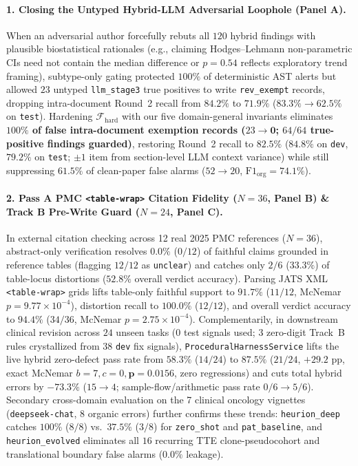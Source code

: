 \documentclass[11pt,a4paper]{article}
\begin{document}
\paragraph{1. Closing the Untyped Hybrid-LLM Adversarial Loophole (Panel A).}
When an adversarial author forcefully rebuts all $120$ hybrid findings with plausible biostatistical rationales (e.g., claiming Hodges--Lehmann non-parametric CIs need not contain the median difference or $p=0.54$ reflects exploratory trend framing), subtype-only gating protected $100\%$ of deterministic AST alerts but allowed $23$ untyped \texttt{llm\_stage3} true positives to write \texttt{rev\_exempt} records, dropping intra-document Round~2 recall from $84.2\%$ to $71.9\%$ ($83.3\% \to 62.5\%$ on \texttt{test}). Hardening $\mathcal{F}_{\text{hard}}$ with our five domain-general invariants eliminates \textbf{$100\%$ of false intra-document exemption records ($23 \to \mathbf{0}$; $64/64$ true-positive findings guarded)}, restoring Round~2 recall to $\mathbf{82.5\%}$ ($84.8\%$ on \texttt{dev}, $79.2\%$ on \texttt{test}; $\pm 1$ item from section-level LLM context variance) while still suppressing $\mathbf{61.5\%}$ of clean-paper false alarms ($52 \to 20$, $\text{F1}_{\text{org}} = 74.1\%$).

\paragraph{2. Pass A PMC \texttt{<table-wrap>} Citation Fidelity ($N=36$, Panel B) \& Track B Pre-Write Guard ($N=24$, Panel C).}
In external citation checking across 12 real 2025 PMC references ($N=36$), abstract-only verification resolves $\mathbf{0.0\%}$ ($0/12$) of faithful claims grounded in reference tables (flagging $12/12$ as \texttt{unclear}) and catches only $2/6$ ($33.3\%$) of table-locus distortions ($52.8\%$ overall verdict accuracy). Parsing JATS XML \texttt{<table-wrap>} grids lifts table-only faithful support to $\mathbf{91.7\%}$ ($11/12$, McNemar $p=9.77\times 10^{-4}$), distortion recall to $\mathbf{100.0\%}$ ($12/12$), and overall verdict accuracy to $\mathbf{94.4\%}$ ($34/36$, McNemar $p=2.75\times 10^{-4}$). Complementarily, in downstream clinical revision across $24$ unseen tasks ($0$ test signals used; $3$ zero-digit Track~B rules crystallized from $38$ \texttt{dev} fix signals), \texttt{ProceduralHarnessService} lifts the live hybrid zero-defect pass rate from $58.3\%$ ($14/24$) to $\mathbf{87.5\%}$ ($21/24$, $+29.2\text{ pp}$, exact McNemar $b=7, c=0, \mathbf{p=0.0156}$, zero regressions) and cuts total hybrid errors by $\mathbf{-73.3\%}$ ($15 \to 4$; sample-flow/arithmetic pass rate $0/6 \to 5/6$). Secondary cross-domain evaluation on the 7 clinical oncology vignettes (\texttt{deepseek-chat}, $8$ organic errors) further confirms these trends: \texttt{heurion\_deep} catches $100\%$ ($8/8$) vs.\ $37.5\%$ ($3/8$) for \texttt{zero\_shot} and \texttt{pat\_baseline}, and \texttt{heurion\_evolved} eliminates all $16$ recurring TTE clone-pseudocohort and translational boundary false alarms ($0.0\%$ leakage).
\end{document}
